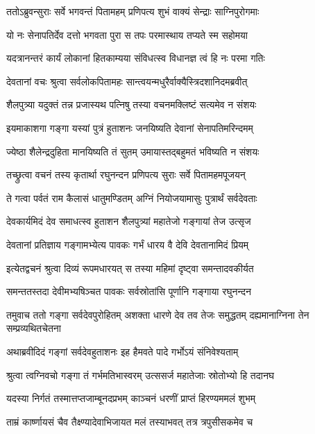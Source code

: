 \twolineshloka
{ततोऽब्रुवन्सुराः सर्वे भगवन्तं पितामहम्}
{प्रणिपत्य शुभं वाक्यं सेन्द्राः साग्निपुरोगमाः} %

\twolineshloka
{यो नः सेनापतिर्देव दत्तो भगवता पुरा}
{स तपः परमास्थाय तप्यते स्म सहोमया} %

\twolineshloka
{यदत्रानन्तरं कार्यं लोकानां हितकाम्यया}
{संविधत्स्व विधानज्ञ त्वं हि नः परमा गतिः} %

\twolineshloka
{देवतानां वचः श्रुत्वा सर्वलोकपितामहः}
{सान्त्वयन्मधुरैर्वाक्यैस्त्रिदशानिदमब्रवीत्} %

\twolineshloka
{शैलपुत्र्या यदुक्तं तन्न प्रजास्यथ पत्निषु}
{तस्या वचनमक्लिष्टं सत्यमेव न संशयः} %

\twolineshloka
{इयमाकाशगा गङ्गा यस्यां पुत्रं हुताशनः}
{जनयिष्यति देवानां सेनापतिमरिन्दमम्} %

\twolineshloka
{ज्येष्ठा शैलेन्द्रदुहिता मानयिष्यति तं सुतम्}
{उमायास्तद्बहुमतं भविष्यति न संशयः} %

\twolineshloka
{तच्छ्रुत्वा वचनं तस्य कृतार्था रघुनन्दन}
{प्रणिपत्य सुराः सर्वे पितामहमपूजयन्} %

\twolineshloka
{ते गत्वा पर्वतं राम कैलासं धातुमण्डितम्}
{अग्निं नियोजयामासुः पुत्रार्थं सर्वदेवताः} %

\twolineshloka
{देवकार्यमिदं देव समाधत्स्व हुताशन}
{शैलपुत्र्यां महातेजो गङ्गायां तेज उत्सृज} %

\twolineshloka
{देवतानां प्रतिज्ञाय गङ्गामभ्येत्य पावकः}
{गर्भं धारय वै देवि देवतानामिदं प्रियम्} %

\twolineshloka
{इत्येतद्वचनं श्रुत्वा दिव्यं रूपमधारयत्}
{स तस्या महिमां दृष्ट्वा समन्तादवकीर्यत} %

\twolineshloka
{समन्ततस्तदा देवीमभ्यषिञ्चत पावकः}
{सर्वस्रोतांसि पूर्णानि गङ्गाया रघुनन्दन} %

\threelineshloka
{तमुवाच ततो गङ्गा सर्वदेवपुरोहितम्}
{अशक्ता धारणे देव तव तेजः समुद्धतम्}
{दह्यमानाग्निना तेन सम्प्रव्यथितचेतना} %

\twolineshloka
{अथाब्रवीदिदं गङ्गां सर्वदेवहुताशनः}
{इह हैमवते पादे गर्भोऽयं संनिवेश्यताम्} %

\twolineshloka
{श्रुत्वा त्वग्निवचो गङ्गा तं गर्भमतिभास्वरम्}
{उत्ससर्ज महातेजाः स्रोतोभ्यो हि तदानघ} %

\twolineshloka
{यदस्या निर्गतं तस्मात्तप्तजाम्बूनदप्रभम्}
{काञ्चनं धरणीं प्राप्तं हिरण्यममलं शुभम्} %

\twolineshloka
{ताम्रं कार्ष्णायसं चैव तैक्ष्ण्यादेवाभिजायत}
{मलं तस्याभवत् तत्र त्रपुसीसकमेव च} %

